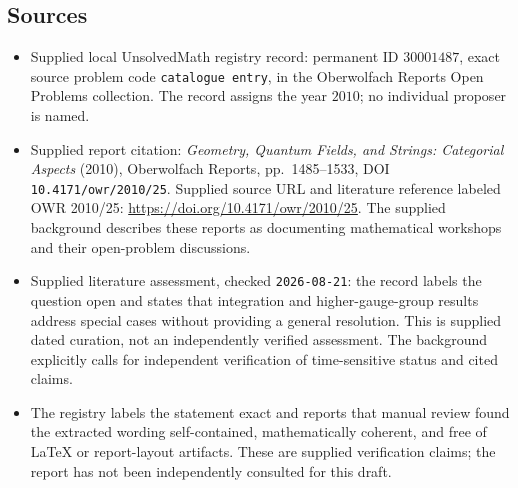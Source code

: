 \documentclass[11pt]{article}
\begin{document}
\subsection{Sources}
\begin{itemize}
\item Supplied local UnsolvedMath registry record: permanent ID \(30001487\), exact source problem code \texttt{catalogue entry}, in the Oberwolfach Reports Open Problems collection. The record assigns the year \(2010\); no individual proposer is named.
\item Supplied report citation: \emph{Geometry, Quantum Fields, and Strings: Categorial Aspects} (2010), Oberwolfach Reports, pp.\ 1485--1533, DOI \texttt{10.4171/owr/2010/25}. Supplied source URL and literature reference labeled OWR 2010/25: \url{https://doi.org/10.4171/owr/2010/25}. The supplied background describes these reports as documenting mathematical workshops and their open-problem discussions.
\item Supplied literature assessment, checked \texttt{2026-08-21}: the record labels the question open and states that integration and higher-gauge-group results address special cases without providing a general resolution. This is supplied dated curation, not an independently verified assessment. The background explicitly calls for independent verification of time-sensitive status and cited claims.
\item The registry labels the statement exact and reports that manual review found the extracted wording self-contained, mathematically coherent, and free of LaTeX or report-layout artifacts. These are supplied verification claims; the report has not been independently consulted for this draft.
\end{itemize}
\end{document}
